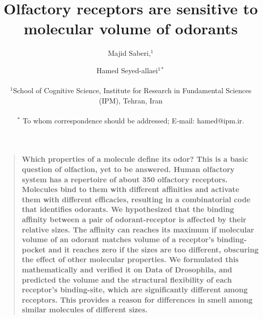 \documentclass[11pt]{article} %
\title{Olfactory receptors are sensitive to molecular volume of odorants}
\author{Majid Saberi,$^1$ \and Hamed Seyed-allaei$^{1\ast}$\\
\\
\normalsize{$^1$School of Cognitive Science, Institute for Research in Fundamental Sciences (IPM), Tehran, Iran}\\
\\
\normalsize{$^\ast$ To whom correspondence should be addressed; E-mail:  hamed@ipm.ir.}\\
}
\newenvironment{sciabstract}{%
\begin{quote} \bf}
{\end{quote}}
\begin{document}

\maketitle

\begin{sciabstract}
	Which properties of a molecule define its odor? 
	This is a basic question of olfaction, 
	yet to be answered. Human olfactory system has a repertoire of about 350 olfactory receptors. 
	Molecules bind to them with different affinities and activate them with different efficacies, 
	resulting in a combinatorial code that identifies odorants. 
	We hypothesized that the binding affinity between a pair of odorant-receptor is affected by their relative sizes. 
	The affinity can reaches its maximum if molecular volume of an odorant matches volume of a receptor's binding-pocket 
	and it reaches zero if the sizes are too different, 
	obscuring the effect of other molecular properties. 
	We formulated this mathematically and verified it on Data of Drosophila, 
	and predicted the volume and the structural flexibility of each receptor’s binding-site, 
	which are significantly different among receptors. 
	This provides a reason for differences in smell among similar molecules of different sizes. 
\end{sciabstract}
\end{document}
